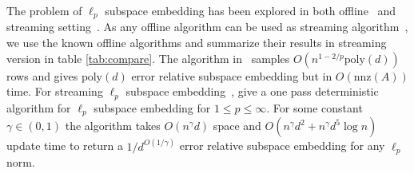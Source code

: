The problem of $\ell_{p}$ subspace embedding has been explored in both offline~\cite{dasgupta2009sampling, woodruff2013subspace, cohen2015p, clarkson2016fast} and streaming setting~\cite{dickens2018leveraging}. As any offline algorithm can be used as streaming algorithm~\cite{har2004coresets}, we use the known offline algorithms and summarize their results in streaming version in table \ref{tab:compare}.
The algorithm in~\cite{woodruff2013subspace} samples $O(n^{1-2/p}\mbox{poly}(d))$ rows and gives $\mbox{poly}(d)$ error relative subspace embedding but in $O(\mbox{nnz}(A))$ time. For streaming $\ell_{p}$ subspace embedding~\cite{dickens2018leveraging}, give a one pass deterministic algorithm for $\ell_{p}$ subspace embedding for $1\leq p\leq \infty$. 
For some constant $\gamma \in (0,1)$ the algorithm takes $O(n^{\gamma}d)$ space and $O(n^{\gamma}d^{2}+n^{\gamma}d^{5}\log n)$ update time to return a $1/d^{O(1/\gamma)}$ error relative subspace embedding for any $\ell_{p}$ norm. 
